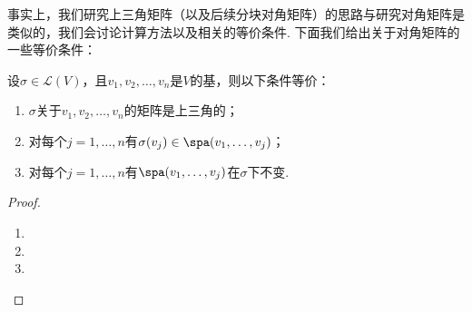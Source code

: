\begin{solution}

\end{solution}

事实上，我们研究上三角矩阵（以及后续分块对角矩阵）的思路与研究对角矩阵是类似的，我们会讨论计算方法以及相关的等价条件. 下面我们给出关于对角矩阵的一些等价条件：
\begin{theorem}\label{thm:20:上三角矩阵等价条件}
    设$\sigma\in \mathcal{L}(V)$，且$v_1,v_2,\ldots,v_n$是$V$的基，则以下条件等价：
    \begin{enumerate}
        \item $\sigma$关于$v_1,v_2,\ldots,v_n$的矩阵是上三角的；

        \item 对每个$j=1,\ldots,n$有$\sigma(v_j)\in\spa(v_1,\ldots,v_j)$；

        \item 对每个$j=1,\ldots,n$有$\spa(v_1,\ldots,v_j)$在$\sigma$下不变.
    \end{enumerate}
\end{theorem}

\begin{proof}
    \begin{enumerate}
        \item

        \item

        \item
    \end{enumerate}
\end{proof}

